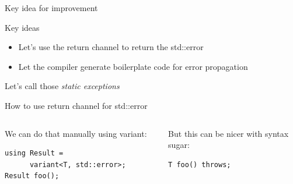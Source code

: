 \documentclass[10pt]{beamer}
\begin{document}
\begin{frame}{Key idea for improvement}
	\begin{block}{Key ideas}
		\begin{itemize}[<+- | alert@+>]
			\item Let's use the return channel to return the std::error
			\item Let the compiler generate boilerplate code for error propagation
		\end{itemize}
	\end{block}
	Let's call those \emph{\color{amethyst}static exceptions}
\end{frame}
	
\begin{frame}[fragile]{How to use return channel for std::error}
	\begin{columns}[T]
		\begin{column}{0.48\linewidth}
			We can do that manually using variant:
			\begin{verbatim}
using Result = 
      variant<T, std::error>;			
Result foo();
			\end{verbatim}
		\end{column}
		\begin{column}{0.48\linewidth}
			But this can be nicer with syntax sugar:
			\begin{verbatim}
T foo() throws;
			\end{verbatim}
		\end{column}
	\end{columns}
\end{frame}
\end{document}
